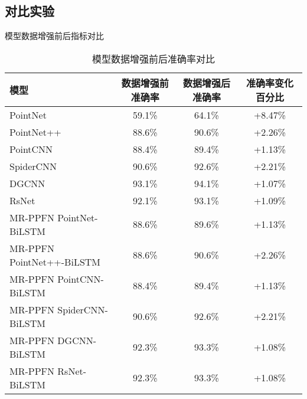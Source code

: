 \subsection{对比实验}
\begin{table}[htbp]
    \caption{模型数据增强前后指标对比}
    \label{tab:metric-comparison}
    \centering

    \begin{subtable}{\linewidth}
        \centering
        \caption{模型数据增强前后准确率对比}
        \begin{tabular}{lc|cc}
            \toprule
            \textbf{模型} & \textbf{数据增强前准确率} & \textbf{数据增强后准确率} & \textbf{准确率变化百分比} \\
            \midrule
            PointNet & 59.1\% & 64.1\% & +8.47\% \\
            PointNet++ & 88.6\% & 90.6\% & +2.26\% \\
            PointCNN & 88.4\% & 89.4\% & +1.13\% \\
            SpiderCNN & 90.6\% & 92.6\% & +2.21\% \\
            DGCNN & 93.1\% & 94.1\% & +1.07\% \\
            RsNet & 92.1\% & 93.1\% & +1.09\% \\
            MR-PPFN PointNet-BiLSTM & 88.6\% & 89.6\% & +1.13\% \\
            MR-PPFN PointNet++-BiLSTM & 88.6\% & 90.6\% & +2.26\% \\
            MR-PPFN PointCNN-BiLSTM & 88.4\% & 89.4\% & +1.13\% \\
            MR-PPFN SpiderCNN-BiLSTM & 90.6\% & 92.6\% & +2.21\% \\
            MR-PPFN DGCNN-BiLSTM & 92.3\% & 93.3\% & +1.08\% \\
            MR-PPFN RsNet-BiLSTM & 92.3\% & 93.3\% & +1.08\% \\
            \bottomrule
        \end{tabular}
        \label{tab:accuracy-comparison}
    \end{subtable}

    \vspace{0.4cm}


\end{table}
